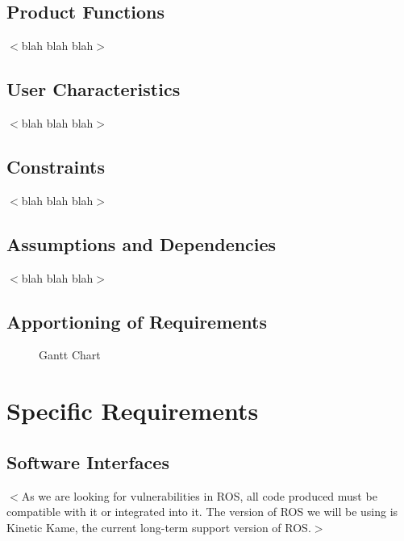 \documentclass{scrreprt}
\begin{document}
\section{Product Functions}
$<$blah blah blah$>$

\section{User Characteristics}
$<$blah blah blah$>$

\section{Constraints}
$<$blah blah blah$>$

\section{Assumptions and Dependencies}
$<$blah blah blah$>$

\section{Apportioning of Requirements}
  \begin{center}
    \begin{figure}
      \caption{Gantt Chart}
      \label{fig:gantt}
    \end{figure}
  \end{center}


\chapter{Specific Requirements}

\section{Software Interfaces}
$<$As we are looking for vulnerabilities in ROS, all code produced must be compatible with it or integrated into it. The version of ROS we will be using is Kinetic Kame, the current long-term support version of ROS.$>$
\end{document}
